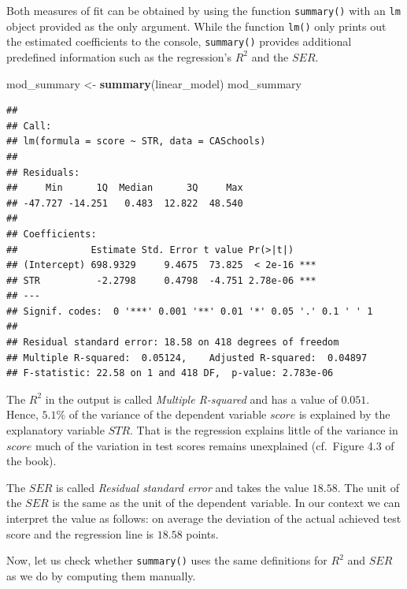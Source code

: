 \documentclass[]{book}
\newenvironment{Shaded}{\begin{snugshade}}{\end{snugshade}}
\newcommand{\KeywordTok}[1]{\textcolor[rgb]{0.13,0.29,0.53}{\textbf{#1}}}
\newcommand{\DecValTok}[1]{\textcolor[rgb]{0.00,0.00,0.81}{#1}}
\newcommand{\StringTok}[1]{\textcolor[rgb]{0.31,0.60,0.02}{#1}}
\newcommand{\CommentTok}[1]{\textcolor[rgb]{0.56,0.35,0.01}{\textit{#1}}}
\newcommand{\OperatorTok}[1]{\textcolor[rgb]{0.81,0.36,0.00}{\textbf{#1}}}
\newcommand{\NormalTok}[1]{#1}
\theoremstyle{definition}
\theoremstyle{definition}
\theoremstyle{definition}
\theoremstyle{remark}
\begin{document}
Both measures of fit can be obtained by using the function
\texttt{summary()} with an \texttt{lm} object provided as the only
argument. While the function \texttt{lm()} only prints out the estimated
coefficients to the console, \texttt{summary()} provides additional
predefined information such as the regression's \(R^2\) and the \(SER\).

\begin{Shaded}
\begin{Highlighting}[]
\NormalTok{mod_summary <-}\StringTok{ }\KeywordTok{summary}\NormalTok{(linear_model)}
\NormalTok{mod_summary}
\end{Highlighting}
\end{Shaded}

\begin{verbatim}
## 
## Call:
## lm(formula = score ~ STR, data = CASchools)
## 
## Residuals:
##     Min      1Q  Median      3Q     Max 
## -47.727 -14.251   0.483  12.822  48.540 
## 
## Coefficients:
##             Estimate Std. Error t value Pr(>|t|)    
## (Intercept) 698.9329     9.4675  73.825  < 2e-16 ***
## STR          -2.2798     0.4798  -4.751 2.78e-06 ***
## ---
## Signif. codes:  0 '***' 0.001 '**' 0.01 '*' 0.05 '.' 0.1 ' ' 1
## 
## Residual standard error: 18.58 on 418 degrees of freedom
## Multiple R-squared:  0.05124,    Adjusted R-squared:  0.04897 
## F-statistic: 22.58 on 1 and 418 DF,  p-value: 2.783e-06
\end{verbatim}

The \(R^2\) in the output is called \emph{Multiple R-squared} and has a
value of \(0.051\). Hence, \(5.1 \%\) of the variance of the dependent
variable \(score\) is explained by the explanatory variable \(STR\).
That is the regression explains little of the variance in \(score\) much
of the variation in test scores remains unexplained (cf.~Figure 4.3 of
the book).

The \(SER\) is called \emph{Residual standard error} and takes the value
\(18.58\). The unit of the \(SER\) is the same as the unit of the
dependent variable. In our context we can interpret the value as
follows: on average the deviation of the actual achieved test score and
the regression line is \(18.58\) points.

Now, let us check whether \texttt{summary()} uses the same definitions
for \(R^2\) and \(SER\) as we do by computing them manually.

\begin{Shaded}
\end{Shaded}
\end{document}
